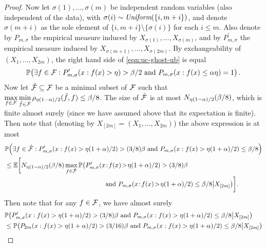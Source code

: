 \begin{proof}
Now let $\sigma(1),\ldots,\sigma(m)$ be independent random variables (also independent of the data), with $\sigma(i) \sim \emph{Uniform}(\{i,m+i\})$,
and denote $\sigma(m+i)$ as the sole element of $\{i,m+i\} \setminus \{\sigma(i)\}$ for each $i \leq m$.
Also denote by $P_{m,\sigma}$ the empirical measure induced by $X_{\sigma(1)},\ldots,X_{\sigma(m)}$, 
and by $P_{m,\sigma}^{\prime}$ the empirical measure induced by $X_{\sigma(m+1)},\ldots,X_{\sigma(2m)}$.
By exchangeability of $(X_{1},\ldots,X_{2m})$, the right hand side of \eqref{eqn:uc-ghost-ub} is equal 
\begin{equation*}
\mathbb{P}\!\left( \exists f \in \mathcal{F} : P_{m,\sigma}^{\prime}( x : f(x) > \eta ) > \beta/2 \text{ and } P_{m,\sigma}( x : f(x) \leq \alpha \eta ) = 1 \right).
\end{equation*}
Now let $\hat{\mathcal{F}} \subseteq \mathcal{F}$ be a minimal subset of $\mathcal{F}$ such that 
$\max\limits_{f \in \mathcal{F}} \min\limits_{\hat{f} \in \hat{\mathcal{F}}} \rho_{\eta (1-\alpha)/2}(\hat{f},f) \leq \beta/8$.
The size of $\hat{\mathcal{F}}$ is at most $N_{\eta(1-\alpha)/2}(\beta/8)$, which is finite almost surely (since we have assumed above that its expectation is finite). %
Then note that (denoting by $X_{[2m]} = (X_{1},\ldots,X_{2m})$) the above expression is at most 
\begin{align}
& \P\!\left( \exists f \in \hat{\F} : P_{m,\sigma}^{\prime}( x : f(x) > \dev (1+\alpha)/2 ) > (3/8)\beta \text{ and } P_{m,\sigma}( x : f(x) > \dev (1+\alpha)/2 ) \leq \beta/8 \right) \notag 
\\ & \leq \E\!\left[ N_{\dev (1-\alpha)/2}(\beta/8) \max_{f \in \hat{\F}} \P\!\left( P_{m,\sigma}^{\prime}( x \!:\! f(x) \!>\! \dev (1+\alpha)/2 ) > (3/8)\beta \right.\right. \notag
\\ & {\hskip 4.5cm} \left. \phantom{\max_{f \in \hat{\F}}} \left. \text{ and } 
P_{m,\sigma}( x \!:\! f(x) \!>\! \dev (1+\alpha)/2 ) \leq \beta/8 \middle| X_{[2m]} \right) \right]\!. \label{eqn:uc-condition-on-data}
\end{align}
Then note that for any $f \in \mathcal{F}$, we have almost surely 
\begin{align*}
& \P\!\left( P_{m,\sigma}^{\prime}( x : f(x) > \dev (1+\alpha)/2 ) > (3/8)\beta \text{ and } P_{m,\sigma}( x : f(x) > \dev (1+\alpha)/2 ) \leq \beta/8 \middle| X_{[2m]} \right)
\\ & \leq \P\!\left( P_{2m}( x : f(x) > \dev (1+\alpha)/2 ) > (3/16) \beta \text{ and } P_{m,\sigma}( x : f(x) > \dev (1+\alpha)/2 ) \leq \beta/8 \middle| X_{[2m]} \right)

\end{align*}
\end{proof}
